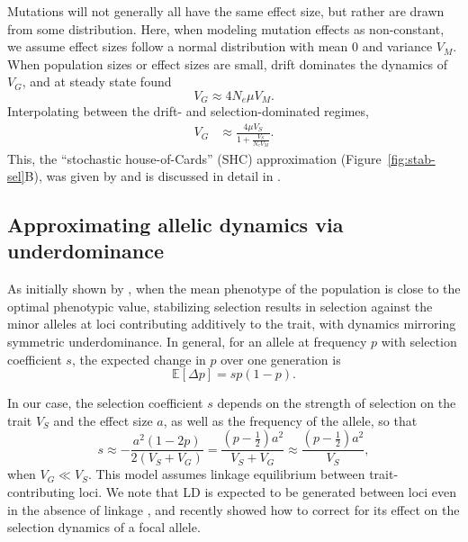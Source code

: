 \documentclass{article}
\newcommand{\E}{\mathbb{E}}
\begin{document}
Mutations will not generally all have the same effect size, but rather are
drawn from some distribution. Here, when modeling mutation effects as
non-constant, we assume effect sizes follow a normal distribution with mean 0
and variance $V_M$. When population sizes or effect sizes are small, drift
dominates the dynamics of $V_G$, and at steady state \citet{lande1976natural}
found \[V_G \approx 4 N_e \mu V_M.\] Interpolating between the drift- and
selection-dominated regimes,
\begin{align}\label{eq:SHC}
    V_G & \approx \frac{4 \mu V_S}{1 + \frac{V_S}{N_e V_M}}.
\end{align}
This, the ``stochastic
house-of-Cards'' (SHC) approximation (Figure~\ref{fig:stab-sel}B), was given by
\citet{burger1989much} and is discussed in detail in \citet[][Ch.
28]{walsh2018evolution}.

\subsection*{Approximating allelic dynamics via underdominance}

As initially shown by \citet{robertson1956effect} \citep[see
also,][]{keightley1988quantitative, simons2018population}, when the mean
phenotype of the population is close to the optimal phenotypic value,
stabilizing selection results in selection against the minor alleles at loci
contributing additively to the trait, with dynamics mirroring symmetric
underdominance. In general, for an allele at frequency $p$ with selection
coefficient $s$, the expected change in $p$ over one generation is
\begin{equation}
    \E[\Delta p] = sp(1-p).
\end{equation}

In our case, the selection coefficient $s$ depends on the strength of selection
on the trait $V_S$ and the effect size $a$, as well as the frequency of the
allele, so that
\begin{equation}
    s\approx -\frac{a^2(1-2p)}{2(V_S+V_G)} 
    = \frac{\left(p-\frac{1}{2}\right)a^2}{V_S + V_G}
    \approx \frac{\left(p-\frac{1}{2}\right)a^2}{V_S},
\end{equation}
when $V_G \ll V_S$. This model assumes linkage equilibrium between
trait-contributing loci. We note that LD is expected to be generated between
loci even in the absence of linkage \citep{bulmer1971effect}, and
\citet{negm2024effect} recently showed how to correct for its effect on the
selection dynamics of a focal allele.
\end{document}
